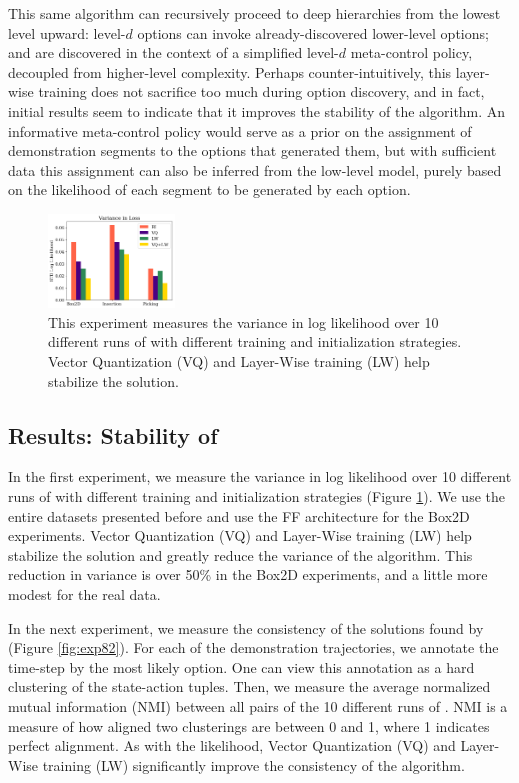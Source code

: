 This same algorithm can recursively proceed to deep hierarchies from the lowest level upward: level-$d$ options can invoke already-discovered lower-level options; and are discovered in the context of a simplified level-$d$ meta-control policy, decoupled from higher-level complexity.
Perhaps counter-intuitively, this layer-wise training does not sacrifice too much during option discovery, and in fact, initial results seem to indicate that it improves the stability of the algorithm.
An informative meta-control policy would serve as a prior on the assignment of demonstration segments to the options that generated them, but with sufficient data this assignment can also be inferred from the low-level model, purely based on the likelihood of each segment to be generated by each option.

\begin{figure} [ht!]
\centering
    \includegraphics[width=0.3\textwidth]{ddco-experiments/exp8-1.png}
    \caption{This experiment measures the variance in log likelihood over 10 different runs of \alg with different training and initialization strategies. Vector Quantization (VQ) and Layer-Wise training (LW) help stabilize the solution. \label{fig:exp81}}
\end{figure}


\subsection*{Results: Stability of \alg}
In the first experiment, we measure the variance in log likelihood over 10 different runs of \alg with different training and initialization strategies (Figure \ref{fig:exp81}). 
We use the entire datasets presented before and use the FF architecture for the Box2D experiments.
Vector Quantization (VQ) and Layer-Wise training (LW) help stabilize the solution and greatly reduce the variance of the algorithm.
This reduction in variance is over 50\% in the Box2D experiments, and a little more modest for the real data.

In the next experiment, we measure the consistency of the solutions found by \alg (Figure \ref{fig:exp82}).
For each of the demonstration trajectories, we annotate the time-step by the most likely option.
One can view this annotation as a hard clustering of the state-action tuples.
Then, we measure the average normalized mutual information (NMI) between all pairs of the 10 different runs of \alg.
NMI is a measure of how aligned two clusterings are between 0 and 1, where 1 indicates perfect alignment.
As with the likelihood, Vector Quantization (VQ) and Layer-Wise training (LW) significantly improve the consistency of the algorithm.


